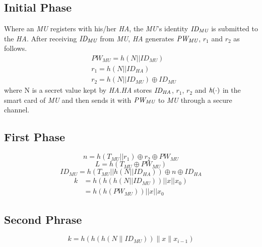 \documentclass{article}
\begin{document}
\subsection{Initial Phase}
Where an \emph{MU} registers with his/her \emph{HA}, the \emph{MU}'s identity $\emph{ID}_{\emph{MU}}$ is submitted to the \emph{HA}. After receiving $\emph{ID}_{\emph{MU}}$ from \emph{MU}, \emph{HA} generates $\emph{PW}_{\emph{MU}}$, $r_1$ and $r_2$ as follows. \\
\begin{align}
    & PW_{MU} = h(N||ID_{MU}) \\
    & r_1 = h(N||ID_{HA}) \\
    & r_2 = h(N||ID_{MU}) \oplus {ID}_{MU}     
\end{align}
where N is a secret value kept by \emph{HA}.\emph{HA} stores $\emph{ID}_{\emph{HA}}$, $r_1$, $r_2$ and $\emph{h}(\cdot)$ in the smart card of \emph{MU} and then sends it with $\emph{PW}_{\emph{MU}}$ to \emph{MU} through a secure channel.
\subsection{First Phase}
    \begin{equation}
        n = h(T_{MU}||r_{1}) \oplus r_{2} \oplus PW_{MU}
    \end{equation}
    \begin{equation}
        L = h(T_{MU} \oplus PW_{MU})
    \end{equation}
    \begin{equation}
        ID_{MU} = h(T_{MU}||h(N|| ID_{HA}))\oplus n \oplus ID_{HA}
    \end{equation}    
   \begin{equation}
    \begin{aligned}
        k & = h(h(h(N||ID_{MU}))||x||x_{0}) \\
          & = h(h(PW_{MU}))||x||x_{0}
    \end{aligned}         
    \end{equation}
\subsection{Second Phrase}
\begin{equation}
    k=h\left(h\left(h\left(N \| I D_{M U}\right)\right)\|x\| x_{i-1}\right)
\end{equation}
\end{document}
